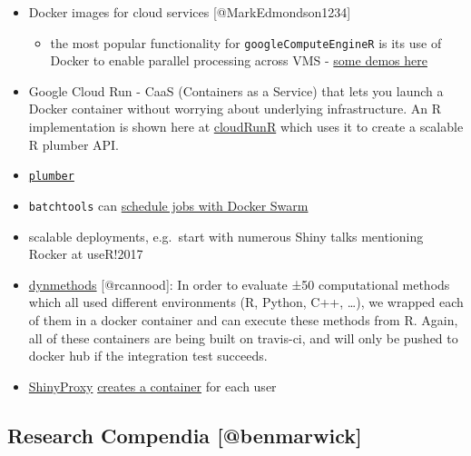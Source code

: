 \begin{itemize}
\tightlist
\item
  Docker images for cloud services {[}@MarkEdmondson1234{]}

  \begin{itemize}
  \tightlist
  \item
    the most popular functionality for \texttt{googleComputeEngineR} is
    its use of Docker to enable parallel processing across VMS -
    \href{https://cloudyr.github.io/googleComputeEngineR/articles/massive-parallel.html}{some
    demos here}
  \end{itemize}
\item
  Google Cloud Run - CaaS (Containers as a Service) that lets you launch
  a Docker container without worrying about underlying infrastructure.
  An R implementation is shown here at
  \href{https://github.com/MarkEdmondson1234/cloudRunR}{cloudRunR} which
  uses it to create a scalable R plumber API.
\item
  \href{https://www.rplumber.io/docs/hosting.html\#docker}{\texttt{plumber}}
\item
  \texttt{batchtools} \citep{Lang2017batchtools} can
  \href{https://mllg.github.io/batchtools/reference/makeClusterFunctionsDocker.html}{schedule
  jobs with Docker Swarm}
\item
  scalable deployments, e.g.~start with numerous Shiny talks mentioning
  Rocker at useR!2017
\item
  \href{https://github.com/dynverse/dynmethods}{dynmethods}
  {[}@rcannood{]}: In order to evaluate ±50 computational methods which
  all used different environments (R, Python, C++, \ldots{}), we wrapped
  each of them in a docker container and can execute these methods from
  R. Again, all of these containers are being built on travis-ci, and
  will only be pushed to docker hub if the integration test succeeds.
\item
  \href{https://www.shinyproxy.io/}{ShinyProxy}
  \href{https://github.com/openanalytics/shinyproxy/blob/master/src/main/java/eu/openanalytics/services/DockerService.java\#L388}{creates
  a container} for each user
\end{itemize}

\hypertarget{research-compendia-benmarwick}{%
\subsection{Research Compendia
{[}@benmarwick{]}}\label{research-compendia-benmarwick}}

